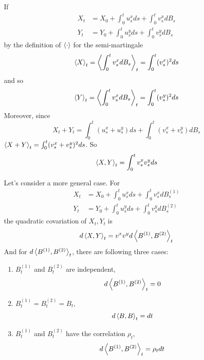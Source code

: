 \documentclass[a4paper,12pt]{article}
\begin{document}
\begin{itemize}
  \begin{rmk}
    If 
    \begin{equation*}
      \begin{split}
        X_t &= X_0 + \int_0^tu^x_sds + \int_0^tv^x_sdB_s \\ 
        Y_t &= Y_0 + \int_0^tu^y_sds + \int_0^tv^y_sdB_s
      \end{split}
    \end{equation*}
    by the definition of $\left\langle \cdot \right\rangle$ for the semi-martingale
    \begin{equation*}
      \left\langle X \right\rangle_t = \left\langle \int_0^tv^x_sdB_s \right\rangle_t = \int_0^t(v^x_s)^2ds
    \end{equation*}
    and so
    \begin{equation*}
      \left\langle Y \right\rangle_t =\left\langle \int_0^tv^x_sdB_s \right\rangle_t = \int_0^t(v^y_s)^2ds
    \end{equation*}
    Moreover, since
    \begin{equation*}
      X_t + Y_t = \int_0^t(u^x_s+u^y_s)ds + \int_0^t(v^x_s+v^y_s)dB_s 
    \end{equation*}
    $\left\langle X+Y \right\rangle_t = \int_0^t(v^x_s+v^y_s)^2ds$. So
    \begin{equation*}
      \left\langle X,Y \right\rangle_t = \int_0^tv^x_sv^y_sds
    \end{equation*}
  \end{rmk}

  \begin{rmk}
    Let's consider a more general case. For
    \begin{equation*}
      \begin{split}
        X_t &= X_0 + \int_0^tu^x_sds + \int_0^tv^x_sdB_s^{(1)} \\ 
        Y_t &= Y_0 + \int_0^tu^y_sds + \int_0^tv^y_sdB_s^{(2)}
      \end{split}
    \end{equation*}
    the quadratic covariation of $X_t, Y_t$ is
    \begin{equation*}
      d\left\langle X,Y \right\rangle_t = v^xv^yd\left\langle B^{(1)},B^{(2)} \right\rangle_t
    \end{equation*}
    And for $d\left\langle B^{(1)},B^{(2)} \right\rangle_t$, there are following three cases:
    \begin{enumerate}[label=(\roman*)]
      \item $B^{(1)}_t$ and $B^{(2)}_t$ are independent,
      \begin{equation*}
        d\left\langle B^{(1)},B^{(2)} \right\rangle_t = 0
      \end{equation*}
      \item $B^{(1)}_t = B^{(2)}_t = B_t$,
      \begin{equation*}
        d\left\langle B,B \right\rangle_t = dt
      \end{equation*}
      \item $B^{(1)}_t$ and $B^{(2)}_t$ have the correlation $\rho_t$,
      \begin{equation*}
        d\left\langle B^{(1)},B^{(2)} \right\rangle_t = \rho_tdt
      \end{equation*}
    \end{enumerate}
  \end{rmk}
  

\end{itemize}
\end{document}
